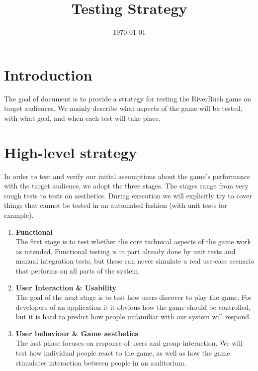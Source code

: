 \documentclass[11pt,a4paper]{article}
\begin{document}
\setlength{\droptitle}{-5em}
\title{
Testing Strategy\\ 
}
\date{\today}
\maketitle

\section{Introduction}
The goal of document is to provide a strategy for testing the RiverRush game on target audiences. We mainly describe what aspects of the game will be tested, with what goal, and when each test will take place. 

\section{High-level strategy}
In order to test and verify our initial assumptions about the game's performance with the target audience, we adopt the three stages. The stages range from very rough tests  to tests on aesthetics. During execution we will explicitly try to cover things that cannot be tested in an automated fashion (with unit tests for example).

\begin{enumerate}
\item \textbf{Functional}\\
The first stage is to test whether the core technical aspects of the game work as intended. Functional testing is in part already done by unit tests and manual integration tests, but these can never simulate a real use-case scenario that performs on all parts of the system. 

\item \textbf{User Interaction \& Usability}\\
The goal of the next stage is to test how users discover to play the game. For developers of an application it it obvious how the game should be controlled, but it is hard to predict how people unfamiliar with our system will respond. 

\item \textbf{User behaviour \& Game aesthetics}\\
The last phase focuses on response of users and group interaction. We will test how individual people react to the game, as well as how the game stimulates interaction between people in an auditorium.
\end{enumerate}
\end{document}
